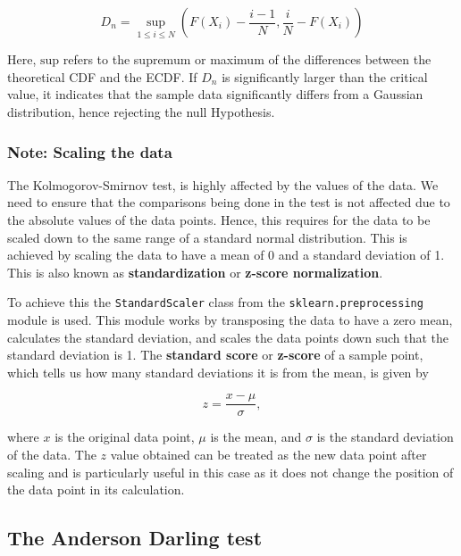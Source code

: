 \documentclass[12pt]{article}
\begin{document}
\begin{equation}
    D_n = \sup_{1 \leq i \leq N} \left( F(X_i) - \frac{i - 1}{N} , \frac{i}{N} - F(X_i) \right)
    \label{eq:ks_statistic}
\end{equation}

\medskip
\noindent Here,  $\text{sup}$ refers to the supremum or maximum of the differences between the theoretical CDF and the ECDF. If $D_n$ is significantly larger than the critical value, it indicates that the sample data significantly differs from a Gaussian distribution, hence rejecting the null Hypothesis.

\subsubsection{Note: Scaling the data}\label{Scaling}

\noindent The Kolmogorov-Smirnov test, is highly affected by the values of the data. We need to ensure that the comparisons being done in the test is not affected due to the absolute values of the data points. Hence, this requires for the data to be scaled down to the same range of a standard normal distribution. This is achieved by scaling the data to have a mean of 0 and a standard deviation of 1. This is also known as \textbf{standardization} or \textbf{z-score normalization}.

\medskip
\noindent To achieve this the \texttt{StandardScaler} class from the \texttt{sklearn.preprocessing} module is used. This module works by transposing the data to have a zero mean, calculates the standard deviation, and scales the data points down such that the standard deviation is 1. The \textbf{standard score} or \textbf{z-score} of a sample point, which tells us how many standard deviations it is from the mean, is given by

\begin{equation}
    z = \frac{x - \mu}{\sigma},
    \label{eq:scaling_formula}
\end{equation}

\medskip
\noindent where $x$ is the original data point, $\mu$ is the mean, and $\sigma$ is the standard deviation of the data. The $z$ value obtained can be treated as the new data point after scaling and is particularly useful in this case as it does not change the position of the data point in its calculation.

\subsection{The Anderson Darling test}\label{AndersonDarling}
\end{document}
